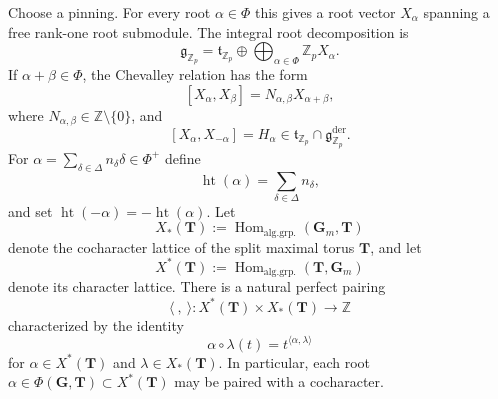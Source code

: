 \documentclass[11pt]{amsart}
\numberwithin{equation}{section}
\newcommand{\Z}{\mathbb Z}
\newcommand{\Zp}{\mathbb Z_p}
\newcommand{\frakg}{\mathfrak g}
\newcommand{\frakt}{\mathfrak t}
\newcommand{\GG}{\mathbf G}
\newcommand{\TT}{\mathbf T}
\newcommand{\Ht}{\operatorname{ht}}
\theoremstyle{definition}
\begin{document}
Choose a pinning. For every root $\alpha\in\Phi$ this gives a root
vector $X_\alpha$ spanning a free rank-one root submodule.  The
integral root decomposition is
\begin{equation}\label{eq:root-decomposition-integral}
        \frakg_{\Zp}
        =
        \frakt_{\Zp}
        \oplus
        \bigoplus_{\alpha\in\Phi}\Zp X_\alpha.
\end{equation}
If $\alpha+\beta\in\Phi$, the Chevalley relation has the form
\begin{equation}\label{eq:Chevalley-root-bracket}
        [X_\alpha,X_\beta]
        =N_{\alpha,\beta}X_{\alpha+\beta},
\end{equation}
where $N_{\alpha,\beta}\in\Z\setminus\{0\}$, and
\begin{equation}\label{eq:opposite-root-bracket}
        [X_\alpha,X_{-\alpha}]=H_\alpha
        \in\frakt_{\Zp}\cap\frakg^{\mathrm{der}}_{\Zp}.
\end{equation}
For $\alpha=\sum_{\delta\in\Delta}n_\delta\delta\in\Phi^+$ define
\[
        \Ht(\alpha)=\sum_{\delta\in\Delta}n_\delta,
\]
and set $\Ht(-\alpha)=-\Ht(\alpha)$. Let
\[
        X_*(\TT)
        :=
        \operatorname{Hom}_{\mathrm{alg.grp.}}(\mathbf G_m,\TT)
\]
denote the cocharacter lattice of the split maximal torus $\TT$, and
let
\[
        X^*(\TT)
        :=
        \operatorname{Hom}_{\mathrm{alg.grp.}}(\TT,\mathbf G_m)
\]
denote its character lattice. There is a natural perfect pairing
\[
        \langle\ ,\ \rangle:
        X^*(\TT)\times X_*(\TT)\longrightarrow\Z
\]
characterized by the identity
\[
        \alpha\circ\lambda(t)
        =
        t^{\langle\alpha,\lambda\rangle}
\]
for $\alpha\in X^*(\TT)$ and $\lambda\in X_*(\TT)$. In particular,
each root $\alpha\in\Phi(\GG,\TT)\subset X^*(\TT)$ may be paired with
a cocharacter.
\end{document}
